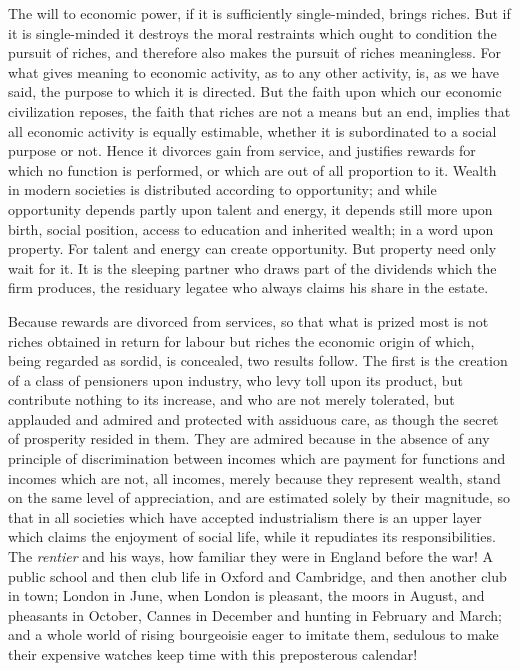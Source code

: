 \documentclass{book}
\begin{document}
The will to economic power, if it is sufficiently single-minded, brings riches. But if it is single-minded it destroys the moral restraints which ought to condition the pursuit of riches, and therefore also makes the pursuit of riches meaningless. For what gives meaning to economic activity, as to any other activity, is, as we have said, the purpose to which it is directed. But the faith upon which our economic civilization reposes, the faith that riches are not a means but an end, implies that all economic activity is equally estimable, whether it is subordinated to a social purpose or not. Hence it divorces gain from service, and justifies rewards for which no function is performed, or which are out of all proportion to it. Wealth in modern societies is distributed according to opportunity; and while opportunity depends partly upon talent and energy, it depends still more upon birth, social position, access to education and inherited wealth; in a word upon property. For talent and energy can create opportunity. But property need only wait for it. It is the sleeping partner who draws part of the dividends which the firm produces, the residuary legatee who always claims his share in the estate.

Because rewards are divorced from services, so that what is prized most is not riches obtained in return for labour but riches the economic origin of which, being regarded as sordid, is concealed, two results follow. The first is the creation of a class of pensioners upon industry, who levy toll upon its product, but contribute nothing to its increase, and who are not merely tolerated, but applauded and admired and protected with assiduous care, as though the secret of prosperity resided in them. They are admired because in the absence of any principle of discrimination between incomes which are payment for functions and incomes which are not, all incomes, merely because they represent wealth, stand on the same level of appreciation, and are estimated solely by their magnitude, so that in all societies which have accepted industrialism there is an upper layer which claims the enjoyment of social life, while it repudiates its responsibilities. The \emph{rentier} and his ways, how familiar they were in England before the war! A public school and then club life in Oxford and Cambridge, and then another club in town; London in June, when London is pleasant, the moors in August, and pheasants in October, Cannes in December and hunting in February and March; and a whole world of rising bourgeoisie eager to imitate them, sedulous to make their expensive watches keep time with this preposterous calendar!
\end{document}
